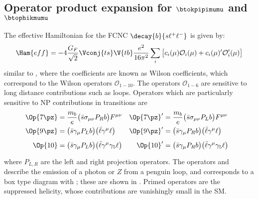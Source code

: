 \subsection[Operator product expansion for \btokpipimumu and \btophikmumu]
{Operator product expansion for $\boldsymbol{\btokpipimumu}$ and $\boldsymbol{\btophikmumu}$}

The effective Hamiltonian for the FCNC $\decay{b}{s\ell^+\ell^-}$ is given by:
\begin{equation}
  \Ham{eff} = -4\frac{G_F}{\sqrt{2}}\Vconj{ts}\V{tb}\frac{e^2}{16\pi^2}
  \sum_{i}\big[c_i(\mu)\mathcal{O}_i(\mu)+c_i(\mu)^\prime\mathcal{O}_i^\prime(\mu)\big]
\end{equation}
similar to , where the coefficients are known as Wilson coefficients, which
correspond to the Wilson operators $\mathcal{O}_{1-10}$.
The operators $\mathcal{O}_{1-6}$ are sensitive to long distance contributions such as \ccbar
loops.
Operators which are particularly sensitive to NP contributions in  transitions are
\begin{align}
  \Op{7\pz} &= \frac{m_b}{e}\big(\bar s \sigma_{\mu\nu}P_Rb\big)F^{\mu\nu}
  &\Op{7\pz}^\prime &= \frac{m_b}{e}\big(\bar s \sigma_{\mu\nu}P_Lb\big)F^{\mu\nu}
  \nonumber\\
  \Op{9\pz} &= \big(\bar s\gamma_\mu P_Lb\big)\big(\bar\ell\gamma^\mu\ell\big)
  &\Op{9\pz}^\prime &= \big(\bar s\gamma_\mu P_Rb\big)\big(\bar\ell\gamma^\mu\ell\big)
  \nonumber\\
  \Op{10} &= \big(\bar s\gamma_\mu P_Lb\big)\big(\bar\ell\gamma^\mu\gamma_5\ell\big)
  &\Op{10}^\prime &= \big(\bar s\gamma_\mu P_Rb\big)\big(\bar\ell\gamma^\mu\gamma_5\ell\big)
  \phantom{\frac{1}{1}}
\end{align}
where $P_{L,R}$ are the left and right projection operators.
The operators  and  describe the emission of a photon or $Z$ from a penguin loop,
and  corresponds to a box type diagram with \Wp; these are shown in .
Primed operators are the suppressed helicity, whose contributions are vanishingly small in the SM.




